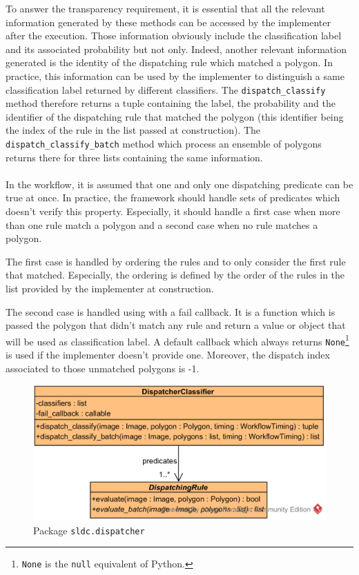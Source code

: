 To answer the transparency requirement, it is essential that all the relevant information generated by these methods can be accessed by the implementer after the execution. Those information obviously include the classification label and its associated probability but not only. Indeed, another relevant information generated is the identity of the dispatching rule which matched a polygon. In practice, this information can be used by the implementer to distinguish a same classification label returned by different classifiers. The \texttt{dispatch\_classify} method therefore returns a tuple containing the label, the probability and the identifier of the dispatching rule that matched the polygon (this identifier being the index of the rule in the list passed at construction). The \texttt{dispatch\_classify\_batch} method which process an ensemble of polygons returns there for three lists containing the same information.
\paragraph{}
In the workflow, it is assumed that one and only one dispatching predicate can be true at once. In practice, the framework should handle sets of predicates which doesn't verify this property. Especially, it should handle a first case when more than one rule match a polygon and a second case when no rule matches a polygon. 

The first case is handled by ordering the rules and to only consider the first rule that matched. Especially, the ordering is defined by the order of the rules in the list provided by the implementer at construction. 

The second case is handled using with a fail callback. It is a function which is passed the polygon that didn't match any rule and return a value or object that will be used as classification label. A default callback which always returns \texttt{None}\footnote{\texttt{None} is the \texttt{null} equivalent of Python.} is used if the implementer doesn't provide one.
Moreover, the dispatch index associated to those unmatched polygons is -1.


\begin{figure}
	\center
	\includegraphics[scale=0.95]{image/uml_dispatcher_classifier.png}
	\caption{Package \texttt{sldc.dispatcher}}
	\label{fig:uml_dispatcher_classifier}
\end{figure}

